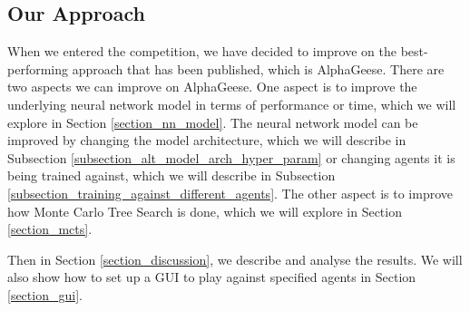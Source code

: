 \subsection{Our Approach}
\label{subsection_approach}

When we entered the competition, we have decided to improve on the best-performing approach that has been published, which is AlphaGeese. There are two aspects we can improve on AlphaGeese. One aspect is to improve the underlying neural network model in terms of performance or time, which we will explore in Section \ref{section_nn_model}. The neural network model can be improved by changing the model architecture, which we will describe in Subsection \ref{subsection_alt_model_arch_hyper_param} or changing agents it is being trained against, which we will describe in Subsection \ref{subsection_training_against_different_agents}. The other aspect is to improve how Monte Carlo Tree Search is done, which we will explore in Section \ref{section_mcts}.

Then in Section \ref{section_discussion}, we describe and analyse the results. We will also show how to set up a GUI to play against specified agents in Section \ref{section_gui}.



